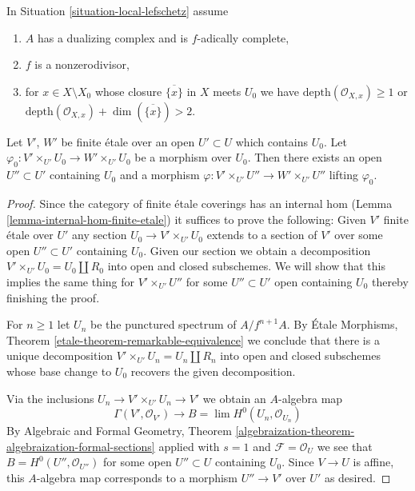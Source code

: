 \begin{lemma}
\label{lemma-fully-faithful-general-better}
In Situation \ref{situation-local-lefschetz} assume
\begin{enumerate}
\item $A$ has a dualizing complex and is $f$-adically complete,
\item $f$ is a nonzerodivisor,
\item for $x \in X \setminus X_0$ whose closure $\overline{\{x\}}$
in $X$ meets $U_0$ we have $\text{depth}(\mathcal{O}_{X, x}) \geq 1$
or $\text{depth}(\mathcal{O}_{X, x}) + \dim(\overline{\{x\}}) > 2$.
\end{enumerate}
Let $V'$, $W'$ be finite \'etale over an open $U' \subset U$
which contains $U_0$. Let
$\varphi_0 : V' \times_{U'} U_0 \to W' \times_{U'} U_0$
be a morphism over $U_0$.
Then there exists an open $U'' \subset U'$
containing $U_0$ and a morphism
$\varphi : V' \times_{U'} U'' \to W' \times_{U'} U''$
lifting $\varphi_0$.
\end{lemma}

\begin{proof}
Since the category of finite \'etale coverings has an internal hom
(Lemma \ref{lemma-internal-hom-finite-etale})
it suffices to prove the following: Given $V'$ finite \'etale over $U'$
any section $U_0 \to V' \times_{U'} U_0$ extends to a section of $V'$
over some open $U'' \subset U'$ containing $U_0$.
Given our section we obtain a decomposition
$V' \times_{U'} U_0 = U_0 \amalg R_0$ into open and closed subschemes.
We will show that this implies the same thing for $V' \times_{U'} U''$
for some $U'' \subset U'$ open containing $U_0$ thereby
finishing the proof.

\medskip\noindent
For $n \geq 1$ let $U_n$ be the punctured spectrum of $A/f^{n + 1}A$. By
\'Etale Morphisms, Theorem \ref{etale-theorem-remarkable-equivalence}
we conclude that there is a unique decomposition
$V' \times_{U'} U_n = U_n \amalg R_n$
into open and closed subschemes whose base change to $U_0$ recovers
the given decomposition.

\medskip\noindent
Via the inclusions $U_n \to V' \times_{U'} U_n \to V'$
we obtain an $A$-algebra map
$$
\Gamma(V', \mathcal{O}_{V'}) \to B = \lim H^0(U_n, \mathcal{O}_{U_n})
$$
By Algebraic and Formal Geometry, Theorem
\ref{algebraization-theorem-algebraization-formal-sections}
applied with $s = 1$ and $\mathcal{F} = \mathcal{O}_U$ we see that
$B = H^0(U'', \mathcal{O}_{U''})$ for some open $U'' \subset U$
containing $U_0$. Since $V \to U$ is affine, this $A$-algebra map
corresponds to a morphism $U'' \to V'$ over $U'$ as desired.
\end{proof}

